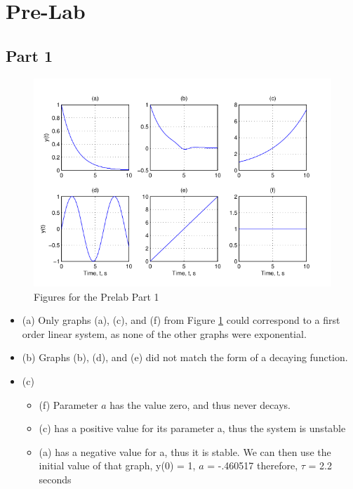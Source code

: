 \documentclass[12pt]{article}
\begin{document}
	
	\section{Pre-Lab}
		\subsection{Part 1}
			\begin{figure}[H]
			\centering
			\includegraphics[width=1\linewidth]{"Code/Fig/prelab_part1.png"}
			\caption{Figures for the Prelab Part 1}
			\label{fig:prelab}
		\end{figure}
		\begin{itemize}
			\item (a) Only graphs (a), (c), and (f) from Figure \ref{fig:prelab} could correspond to a first order linear system, as none of the other graphs were exponential.
			\item (b) Graphs (b), (d), and (e) did not match the form of a decaying function.
			\item (c) \begin{itemize}
				\item (f) Parameter $a$ has the value zero, and thus never decays.
				\item (c)  has a positive value for its parameter a, thus the system is unstable
				\item (a)  has a negative value for a, thus it is stable. We can then use the initial value of that graph,
				y(0) = 1, $a$ = -.460517 therefore, $\tau$ = 2.2 seconds
			\end{itemize}
		\end{itemize}
		
\end{document}
